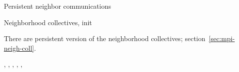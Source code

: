  {Persistent neighbor communications}

\begin{mpifournote}{Neighborhood collectives, init}

  There are persistent version of the neighborhood collectives;
  section~\ref{sec:mpi-neigh-coll}.

  \begin{raggedlist} %
    ,
    ,
    ,
    ,
    ,
  \end{raggedlist} %

\end{mpifournote}


